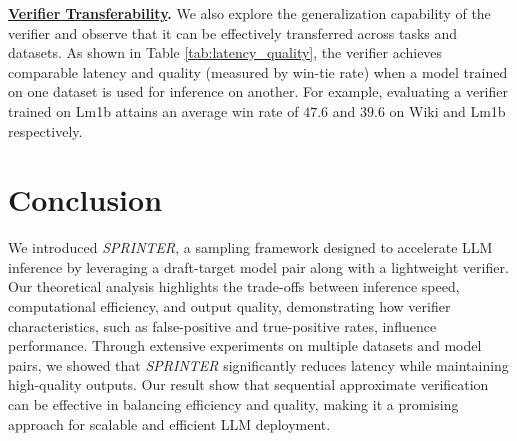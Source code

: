 \documentclass{article}
\newcommand{\revision}[1]{{\color{black} #1}}
\theoremstyle{plain}
\theoremstyle{definition}
\theoremstyle{remark}
\begin{document}
{\begin{table}[t]
\centering
{}
\caption{\revision{Comparison of Latency and Quality between WiKi and Lm1b datasets. The verifier maintains comparable latency and quality when trained on one dataset and evaluated on another. Highlighted entries show the average win-tie rates using verifiers trained/evaluated on the same dataset.}}
\label{tab:latency_quality}
\end{table}
\textbf{\underline{Verifier Transferability}.} We also explore the generalization capability of the verifier and observe that it can be effectively transferred across tasks and datasets. As shown in Table \ref{tab:latency_quality}, the verifier achieves comparable latency and quality (measured by win-tie rate) when a model trained on one dataset is used for inference on another. For example, evaluating a verifier trained on Lm1b attains an average win rate of $47.6$ and $39.6$ on Wiki and Lm1b respectively.}



\vspace{-8pt}
\section{Conclusion}
\vspace{-5pt}
We introduced \textit{SPRINTER}, a sampling framework designed to accelerate LLM inference by leveraging a draft-target model pair along with a lightweight verifier. Our theoretical analysis highlights the trade-offs between inference speed, computational efficiency, and output quality, demonstrating how verifier characteristics, such as false-positive and true-positive rates, influence performance. Through extensive experiments on multiple datasets and model pairs, we showed that \textit{SPRINTER} significantly reduces latency while maintaining high-quality outputs. Our result show that sequential approximate verification can be effective in balancing efficiency and quality, making it a promising approach for scalable and efficient LLM deployment.
\end{document}
